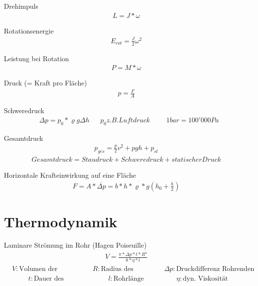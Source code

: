 \documentclass[17pt]{extarticle}
\begin{document}
	Drehimpuls 
	\begin{align}
		L = J * \omega
	\end{align}
	
	Rotationsenergie
	\begin{align}
		E_{rot} = \frac{J}{2} \omega^2
	\end{align}
	
	Leistung bei Rotation
	\begin{align}
		P = M * \omega
	\end{align}
	
	Druck (= Kraft pro Fläche)
	\begin{align}
		p = \frac{F}{A}
	\end{align}	
	
	Schweredruck 
	\begin{align}
		&\Delta p = p_0 * \varrho g \Delta h
		&&p_0 z.B. Luftdruck 
		&&&1 bar = 100'000 Pa
	\end{align}
	
	Gesamtdruck
	\begin{align}
		p_{ges} = \frac{p}{2}v^2 + pgh + p_{st}
	\end{align}
	\begin{align}		
		Gesamtdruck = Staudruck + Schweredruck + statischer Druck
	\end{align}

	Horizontale Krafteinwirkung auf eine Fläche
	\begin{align}
		F = A * \overline{\Delta p} = b*h * \varrho*g (h_{0} + \frac{h}{2})
	\end{align}
	
	
\section{Thermodynamik}
	


	Laminare Strömung im Rohr (Hagen Poiseuille)
	\begin{align}
		V = \frac{\pi * \Delta p * t * R^4}{8 * \eta * l}
	\end{align}
	\begin{align}
		&V: \text{Volumen der Flüssigkeit}
		&&R: \text{Radius des Rohres}
		&&&\Delta p: \text{Druckdifferenz Rohrenden}
	\end{align}
	\begin{align}
		&&&&t: \text{Dauer des Flusses}
		&&&&&l: \text{Rohrlänge}
		&&&&&&\eta: \text{dyn. Viskosität (konst.)}
	\end{align}
	
\end{document}
